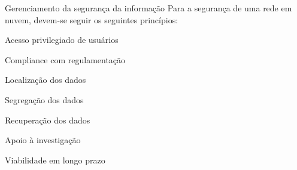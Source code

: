 \begin{frame}{Gerenciamento da segurança da informação}
    Para a segurança de uma rede em nuvem, devem-se seguir os seguintes princípios:
    \begin{itemise}
        \item<2-> Acesso privilegiado de usuários
        \item<3-> Compliance com regulamentação
        \item<4-> Localização dos dados
        \item<5-> Segregação dos dados
        \item<6-> Recuperação dos dados
        \item<7-> Apoio à investigação
        \item<8-> Viabilidade em longo prazo
    \end{itemise}
\end{frame}
